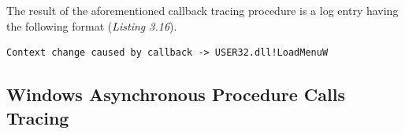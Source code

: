 The result of the aforementioned callback tracing procedure is a log entry having the following format (\textit{Listing 3.16}).
\\
\begin{lstlisting}[caption={Log entry relative to a user mode callback},captionpos=b]
Context change caused by callback -> USER32.dll!LoadMenuW
\end{lstlisting}


\subsection{Windows Asynchronous Procedure Calls Tracing}

